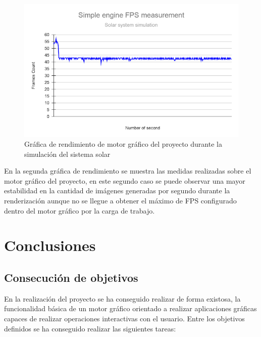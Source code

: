 \documentclass[a4paper, 17pt]{book}
\begin{document}
\begin{figure}[H]
    \centering
    \includegraphics[scale=0.50, keepaspectratio]{img/FPSEngine.png}
    \caption{Gráfica de rendimiento de motor gráfico del proyecto durante la simulación del sistema solar}
    \label{figura:materialesBlender}
\end{figure}

En la segunda gráfica de rendimiento se muestra las medidas realizadas sobre el motor gráfico del proyecto, en este segundo
caso se puede observar una mayor estabilidad en la cantidad de imágenes generadas por segundo durante la renderización
aunque no se llegue a obtener el máximo de FPS configurado dentro del motor gráfico por la carga de trabajo.


\cleardoublepage
\chapter{Conclusiones}
\label{chap:conclusiones}


\section{Consecución de objetivos}
\label{sec:consecucion-objetivos}

En la realización del proyecto se ha conseguido realizar de forma existosa, la funcionalidad básica de un motor gráfico orientado
a realizar aplicaciones gráficas capaces de realizar operaciones interactivas con el usuario. Entre los objetivos definidos se ha
conseguido realizar las siguientes tareas:
\end{document}
